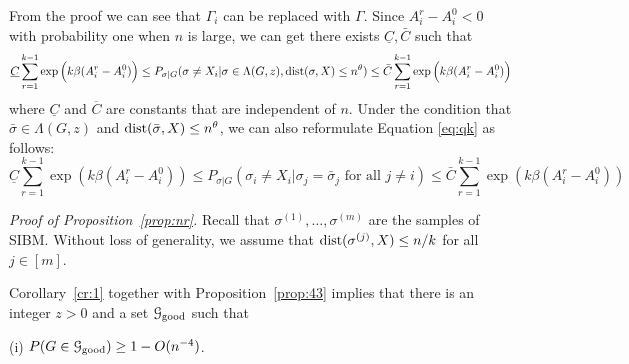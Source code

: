 \documentclass{article}
\begin{document}
\begin{remark}
	From the proof we can see that $\Gamma_i$ can be replaced with $\Gamma$. Since $A_i^r - A_i^0 < 0$ with probability one when
	$n$ is large, we can get there exists $\underline{C}, \bar{C}$ such that
	\begin{equation} \label{eq:qke}
	\underline{C}\sum_{r=1}^{k-1}\exp\Big(k\beta(A^r_i-A^0_i) \Big)  \le 
	P_{\sigma|G}(\sigma \neq X_i | \sigma \in \Lambda(G, z),
	\operatorname{dist}(\sigma, X) \leq n^{\theta})
	\le \bar{C} \sum_{r=1}^{k-1}\exp\Big(k\beta (A^r_i-A^0_i ) \Big) 
	\end{equation}
	where $\underline{C}$ and $\overline{C}$ are constants that are independent of $n$.
	Under the condition that $\bar{\sigma} \in \Lambda(G, z)$ and
	$\operatorname{dist}(\bar{\sigma}, X) \leq n^{\theta}$,
	we can also reformulate Equation \eqref{eq:qk} as follows:
	\begin{equation}\label{eq:soon}
	\underline{C} \sum_{r=1}^{k-1} \exp(k\beta(A^r_i - A^0_i)) \leq P_{\sigma | G}(\sigma_i \neq X_i | \sigma_j = \bar{\sigma}_j \text{ for all } j\neq i ) \leq
	\bar{C} \sum_{r=1}^{k-1} \exp(k\beta(A^r_i - A^0_i))
	\end{equation}
\end{remark}

\noindent
{\em Proof of Proposition~\ref{prop:nr}.}
Recall that $\sigma^{(1)},\dots,\sigma^{(m)}$ are the samples of SIBM.
Without loss of generality, we assume that 
$\operatorname{dist}(\sigma^{(j)}, X) \le n/k$ for all $j\in[m]$. 

Corollary~\ref{cr:1} together with Proposition~\ref{prop:43} implies that there is an integer $z>0$ and a set $\mathcal{G}_{\operatorname{good}}$ such that

\noindent (i)
$P(G\in\mathcal{G}_{\operatorname{good}}) \ge 1- O(n^{-4})$.
\end{document}
